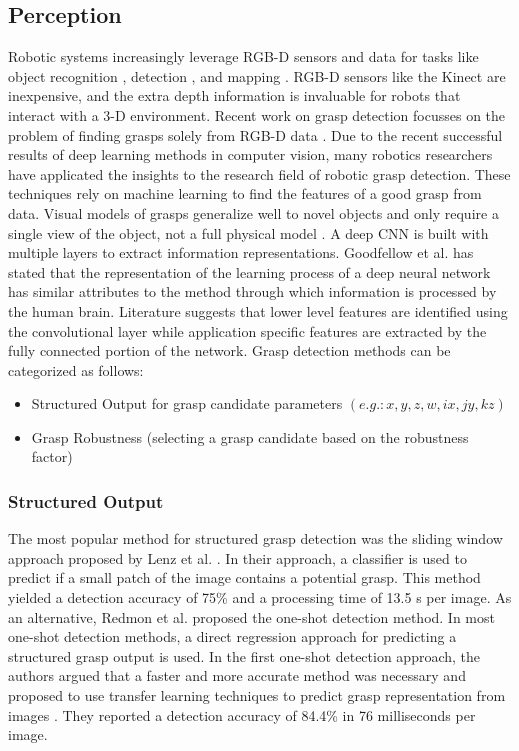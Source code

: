 \documentclass[a4paper]{article}
\begin{document}
\subsection{Perception}
\label{3_1subsec_perception}
Robotic systems increasingly leverage RGB-D sensors and data for tasks like object recognition \cite{8_lai2011large}, detection \cite{9_lai2012detection}, and mapping \cite{11_du2011rgb}. 
RGB-D sensors like the Kinect are inexpensive, and the extra depth information is invaluable for robots that interact with a 3-D environment.
Recent work on grasp detection focusses on the problem of finding grasps solely from RGB-D data \cite{13_saxena2008robotic}. 
Due to the recent successful results of deep learning methods in computer vision, many robotics researchers have applicated the insights to the research field of robotic grasp detection.
These techniques rely on machine learning to find the features of a good grasp from data. 
Visual models of grasps generalize well to novel objects and only require a single view of the object, not a full physical model \cite{18_erhan2014scalable}.
A deep CNN is built with multiple layers to extract information representations.
Goodfellow et al. \cite{goodfellow2016deep} has stated that the representation of the learning process of a deep neural network has similar attributes to the method through which information is processed by the human brain. 
Literature suggests that lower level features are identified using the convolutional layer while application specific features are extracted by the fully connected portion of the network.
Grasp detection methods can be categorized as follows:
\begin{itemize}
    \item Structured Output for grasp candidate parameters $(e.g.: x, y, z, w, ix, jy, kz)$
    \item Grasp Robustness (selecting a grasp candidate based on the robustness factor)
\end{itemize}

\subsubsection{Structured Output}
The most popular method for structured grasp detection was the sliding window approach proposed by Lenz et al. \cite{18_erhan2014scalable}. 
In their approach, a classifier is used to predict if a small patch of the image contains a potential grasp.
This method yielded a detection accuracy of 75\% and a processing time of 13.5 s per image.
As an alternative, Redmon et al. \cite{19_redmon2015real} proposed the one-shot detection method.
In most one-shot detection methods, a direct regression approach for predicting a structured grasp output is used. 
In the first one-shot detection approach, the authors argued that a faster and more accurate method was necessary and proposed to use transfer learning techniques to predict grasp representation from images \cite{19_redmon2015real}. 
They reported a detection accuracy of 84.4\% in 76 milliseconds per image.
\end{document}
